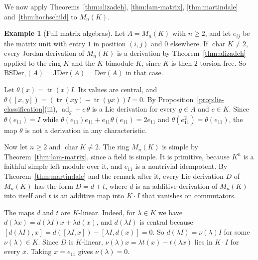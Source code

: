 \documentclass[]{interact}
\theoremstyle{plain}
\theoremstyle{definition}
\newtheorem{example}[theorem]{Example}
\theoremstyle{remark}
\newcommand{\Der}{\mathrm{Der}}
\newcommand{\JDer}{\mathrm{JDer}}
\newcommand{\BSDer}{\mathrm{BSDer}}
\begin{document}
We now apply Theorems~\ref{thm:alizadeh}, \ref{thm:lam-matrix}, \ref{thm:martindale} and~\ref{thm:hochschild} to $M_n(K)$.

\begin{example}[Full matrix algebras]\label{ex:matrix}
Let $A = M_n(K)$ with $n \geq 2$, and let $e_{ij}$ be the matrix unit with entry $1$ in position $(i,j)$ and $0$ elsewhere.
If $\operatorname{char} K \neq 2$, every Jordan derivation of $M_n(K)$ is a derivation by Theorem~\ref{thm:alizadeh} applied to the ring $K$ and the $K$-bimodule $K$, since $K$ is then $2$-torsion free.
So $\BSDer_\tau(A) = \JDer(A) = \Der(A)$ in that case.

Let $\theta(x) = \operatorname{tr}(x) I$.
Its values are central, and $\theta([x,y]) = (\operatorname{tr}(xy) - \operatorname{tr}(yx)) I = 0$.
By Proposition~\ref{prop:lie-classification}(iii), $\operatorname{ad}_g + c\,\theta$ is a Lie derivation for every $g \in A$ and $c \in K$.
Since $\theta(e_{11}) = I$ while $\theta(e_{11})e_{11} + e_{11}\theta(e_{11}) = 2e_{11}$ and $\theta(e_{11}^2) = \theta(e_{11})$, the map $\theta$ is not a derivation in any characteristic.

Now let $n \geq 2$ and $\operatorname{char} K \neq 2$.
The ring $M_n(K)$ is simple by Theorem~\ref{thm:lam-matrix}, since a field is simple.
It is primitive, because $K^n$ is a faithful simple left module over it, and $e_{11}$ is a nontrivial idempotent.
By Theorem~\ref{thm:martindale} and the remark after it, every Lie derivation $D$ of $M_n(K)$ has the form $D = d + t$, where $d$ is an additive derivation of $M_n(K)$ into itself and $t$ is an additive map into $K \cdot I$ that vanishes on commutators.

The maps $d$ and $t$ are $K$-linear.
Indeed, for $\lambda \in K$ we have $d(\lambda x) = d(\lambda I)x + \lambda d(x)$, and $d(\lambda I)$ is central because $[d(\lambda I), x] = d([\lambda I, x]) - [\lambda I, d(x)] = 0$.
So $d(\lambda I) = \nu(\lambda) I$ for some $\nu(\lambda) \in K$.
Since $D$ is $K$-linear, $\nu(\lambda)x = \lambda t(x) - t(\lambda x)$ lies in $K \cdot I$ for every $x$.
Taking $x = e_{11}$ gives $\nu(\lambda) = 0$.


\end{example}
\end{document}
